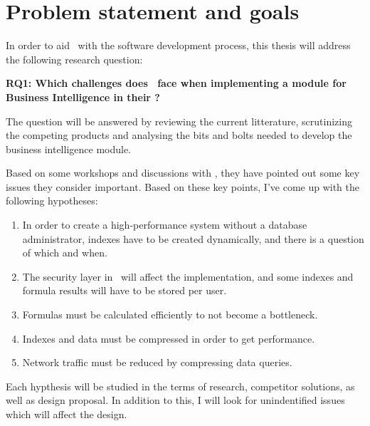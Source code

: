 \section{Problem statement and goals}
\label{sec:problem-statement-and-goals}
In order to aid \genus~with the software development process, this thesis will address the following research question:

\textbf{RQ1: Which challenges does \genus~face when implementing a module for Business Intelligence in their \genusSoftware?}

The question will be answered by reviewing the current litterature, scrutinizing the competing products and analysing the bits and bolts needed to develop the business intelligence module.

Based on some workshops and discussions with \genus , they have pointed out some key issues they consider important. Based on these key points, I've come up with the following hypotheses:
\begin{enumerate}\bfseries
  \item In order to create a high-performance system without a database administrator, indexes have to be created dynamically, and there is a question of which and when.
  \item The security layer in \genusSoftware~will affect the implementation, and some indexes and formula results will have to be stored per user.
  \item Formulas must be calculated efficiently to not become a bottleneck.
  \item Indexes and data must be compressed in order to get performance.
  \item Network traffic must be reduced by compressing data queries.
\end{enumerate}

Each hypthesis will be studied in the terms of research, competitor solutions, as well as design proposal. In addition to this, I will look for unindentified issues which will affect the design.


